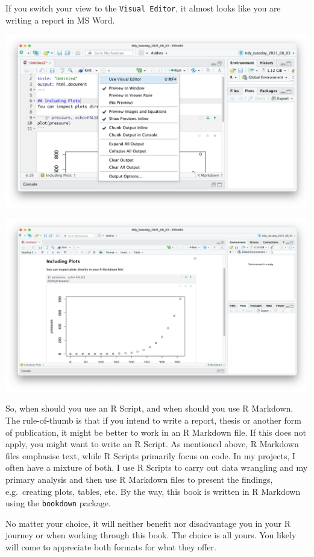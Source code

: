 \documentclass[
]{book}
\begin{document}
If you switch your view to the \texttt{Visual\ Editor}, it almost looks like you are writing a report in MS Word.

\includegraphics{images/chapter_06_img/03_r_markdown/02_r_markdown_visual_editor_menu.png}

\includegraphics{images/chapter_06_img/03_r_markdown/03_r_markdown_visual_editor.png}

So, when should you use an R Script, and when should you use R Markdown. The rule-of-thumb is that if you intend to write a report, thesis or another form of publication, it might be better to work in an R Markdown file. If this does not apply, you might want to write an R Script. As mentioned above, R Markdown files emphasise text, while R Scripts primarily focus on code. In my projects, I often have a mixture of both. I use R Scripts to carry out data wrangling and my primary analysis and then use R Markdown files to present the findings, e.g.~creating plots, tables, etc. By the way, this book is written in R Markdown using the \texttt{bookdown} package.

No matter your choice, it will neither benefit nor disadvantage you in your R journey or when working through this book. The choice is all yours. You likely will come to appreciate both formats for what they offer.
\end{document}
